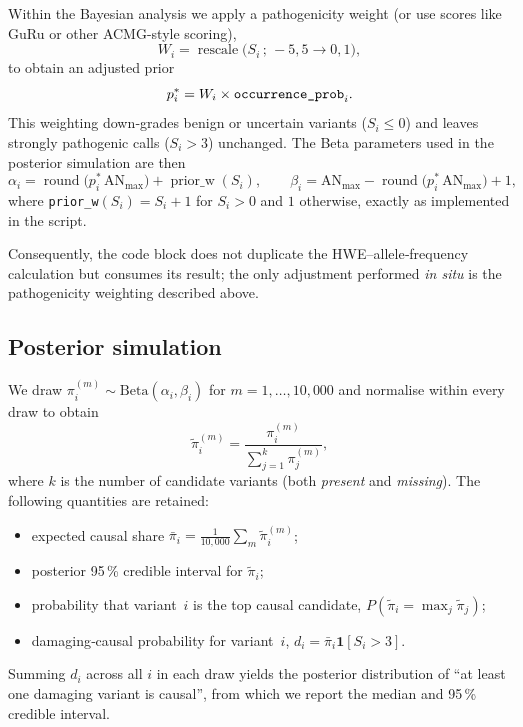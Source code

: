 Within the Bayesian analysis we apply
a pathogenicity weight (or use scores like GuRu or other ACMG-style scoring),
\[
W_i=\operatorname{rescale}\!\bigl(S_i\,;\,-5,5\rightarrow 0,1\bigr),
\]
to obtain an adjusted prior
\[
p_i^{\ast}=W_i \times \verb|occurrence_prob|_i .
\]
This weighting down‑grades benign or uncertain variants
($S_i\le 0$) and leaves strongly pathogenic calls ($S_i>3$) unchanged.
The Beta parameters used in the posterior simulation are then
\[
\alpha_i=\operatorname{round}\!\bigl(p_i^{\ast}\,\text{AN}_{\max}\bigr)+
          \operatorname{prior\_w}(S_i),
\qquad
\beta_i = \text{AN}_{\max}-\operatorname{round}\!\bigl(p_i^{\ast}\,
          \text{AN}_{\max}\bigr)+1,
\]
where \verb|prior_w|$(S_i)=S_i+1$ for $S_i>0$ and $1$ otherwise, exactly
as implemented in the script.

Consequently, the code block does not duplicate the
HWE–allele‑frequency calculation but consumes its result; the only
adjustment performed \emph{in situ} is the pathogenicity weighting
described above.

\subsection{Posterior simulation}

We draw
$\pi_{i}^{(m)}\sim\mathrm{Beta}(\alpha_i,\beta_i)$ for
$m=1,\dots,10{,}000$ and normalise within every draw to obtain
\[
\tilde{\pi}_{i}^{(m)} = 
\frac{\pi_{i}^{(m)}}{\sum_{j=1}^{k}\pi_{j}^{(m)}},
\]
where $k$ is the number of candidate variants (both \emph{present} and
\emph{missing}).  The following quantities are retained:

\begin{itemize}
  \item expected causal share
        $\bar{\pi}_i=\frac1{10{,}000}\sum_m\tilde{\pi}_{i}^{(m)}$;
  \item posterior 95\,\% credible interval for $\tilde{\pi}_i$;
  \item probability that variant~$i$ is the top causal candidate,
        $P(\tilde{\pi}_i=\max_j\tilde{\pi}_j)$;
  \item damaging‑causal probability for variant~$i$,
        $d_i=\bar{\pi}_i\mathbf{1}[S_i>3]$.
\end{itemize}

Summing $d_i$ across all $i$ in each draw yields the posterior
distribution of “at least one damaging variant is causal”, from which
we report the median and 95\,\% credible interval.

